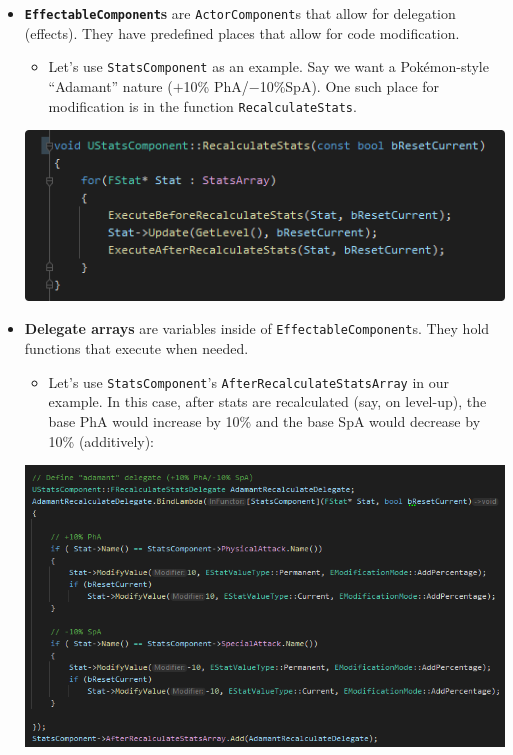 

\begin{tldr}
	\todo{}
\end{tldr}


\newcommand{\SubItem}[1]{\begin{itemize}\item{#1}\end{itemize}}

\begin{itemize}
	\item{\textbf{\texttt{EffectableComponent}s} are \texttt{ActorComponent}s that allow for delegation (effects). They have predefined places that allow for code modification. 
		\SubItem{Let's use \texttt{StatsComponent} as an example. Say we want a Pok\'{e}mon-style ``Adamant'' nature ($+$10\% PhA/$-$10\%SpA). One such place for modification is in the function \texttt{RecalculateStats}.}
		\begin{center}
			\includegraphics[scale=2.5]{recalculate-stats-code}
		\end{center}
		}
	\item{\textbf{Delegate arrays} are variables inside of \texttt{EffectableComponent}s. They hold functions that execute when needed.
		\SubItem{Let's use \texttt{StatsComponent}'s \texttt{AfterRecalculateStatsArray} in our example. In this case, after stats are recalculated (say, on level-up), the base PhA would increase by 10\% and the base SpA would decrease by 10\% (additively): }
		\begin{center}
			\includegraphics[scale=2.5]{adamant-code}
		\end{center}		 
		}
\end{itemize}

